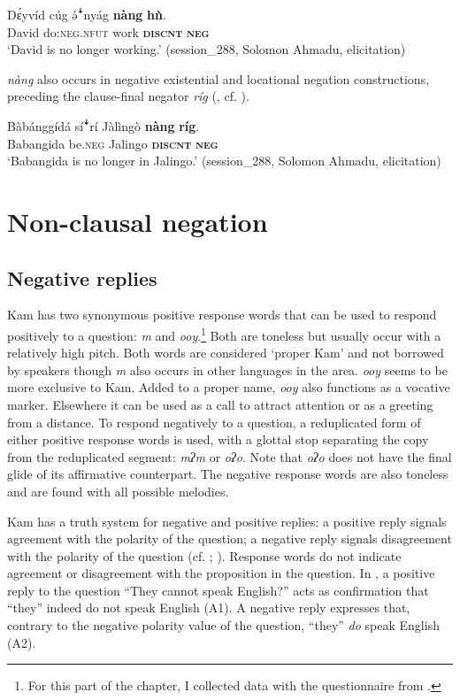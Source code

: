 \documentclass[output=paper,colorlinks,citecolor=brown]{langscibook}
\begin{document}
\ea\label{ex:kam:64} 
    \gll Dɛ́yvíd cúg ə́ꜜnyág \textbf{nàng} \textbf{hǹ}.\\
        David do:\textsc{neg}.\textsc{nfut} work \textbf{\textsc{discnt}} \textsc{\textbf{neg}}\\
    \glt ‘David is no longer working.’ (session\_288, Solomon Ahmadu, elicitation)
\z 

\textit{nàng} also occurs in negative existential and locational negation constructions, preceding the clause-final negator \textit{ríg} (, cf. ).

\ea\label{ex:kam:65} 
    \gll Bàbánggídá síꜜrí Jàlìngò \textbf{nàng} \textbf{ríg}.\\
        Babangida be.\textsc{neg} Jalingo \textbf{\textsc{discnt}} \textsc{\textbf{neg}}\\
    \glt \textsc{‘}Babangida is no longer in Jalingo.’ (session\_288, Solomon Ahmadu, elicitation)
\z 

\section{Non-clausal negation}\label{sec:kam:3}
\subsection{Negative replies}\label{sec:kam:3.1}

Kam has two synonymous positive response words that can be used to respond positively to a question: \textit{m} and \textit{ooy}.\footnote{For this part of the chapter, I collected data with the questionnaire from \citet{Moser2018}.} Both are toneless but usually occur with a relatively high pitch. Both words are considered ‘proper Kam’ and not borrowed by speakers though \textit{m} also occurs in other languages in the area. \textit{ooy} seems to be more exclusive to Kam. Added to a proper name, \textit{ooy} also functions as a vocative marker. Elsewhere it can be used as a call to attract attention or as a greeting from a distance. To respond negatively to a question, a reduplicated form of either positive response words is used, with a glottal stop separating the copy from the reduplicated segment: \textit{mʔm} or \textit{oʔo}. Note that \textit{oʔo} does not have the final glide of its affirmative counterpart. The negative response words are also toneless and are found with all possible melodies.

Kam has a truth system for negative and positive replies: a positive reply signals agreement with the polarity of the question; a negative reply signals disagreement with the polarity of the question (cf. \citealt{Holmberg2015}; \citealt{Moser2018}). Response words do not indicate agreement or disagreement with the proposition in the question.
In , a positive reply to the question “They cannot speak English?” acts as confirmation that “they” indeed do not speak English (A1). A negative reply expresses that, contrary to the negative polarity value of the question, “they” \textit{do} speak English (A2). 
    
\end{document}
